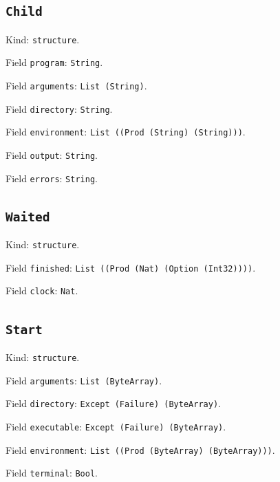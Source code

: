 \documentclass[11pt]{article}
\begin{document}
\subsection*{\texttt{Child}}
\noindent Kind: \texttt{structure}.\par
\noindent Field \texttt{program}: \texttt{String}.\par
\noindent Field \texttt{arguments}: \texttt{List (String)}.\par
\noindent Field \texttt{directory}: \texttt{String}.\par
\noindent Field \texttt{environment}: \texttt{List ((Prod (String) (String)))}.\par
\noindent Field \texttt{output}: \texttt{String}.\par
\noindent Field \texttt{errors}: \texttt{String}.\par
\subsection*{\texttt{Waited}}
\noindent Kind: \texttt{structure}.\par
\noindent Field \texttt{finished}: \texttt{List ((Prod (Nat) (Option (Int32))))}.\par
\noindent Field \texttt{clock}: \texttt{Nat}.\par
\subsection*{\texttt{Start}}
\noindent Kind: \texttt{structure}.\par
\noindent Field \texttt{arguments}: \texttt{List (ByteArray)}.\par
\noindent Field \texttt{directory}: \texttt{Except (Failure) (ByteArray)}.\par
\noindent Field \texttt{executable}: \texttt{Except (Failure) (ByteArray)}.\par
\noindent Field \texttt{environment}: \texttt{List ((Prod (ByteArray) (ByteArray)))}.\par
\noindent Field \texttt{terminal}: \texttt{Bool}.\par
\end{document}
